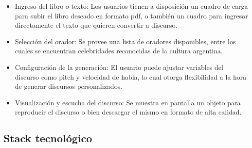 \begin{itemize}
    \item Ingreso del libro o texto: Los usuarios tienen a disposición un cuadro de carga para subir el libro deseado en formato pdf, o también un cuadro para ingresar directamente el texto que quieren convertir a discurso.
    \item Selección del orador: Se provee una lista de oradores disponibles, entre los cuales se encuentran celebridades reconocidas de la cultura argentina.
    \item Configuración de la generación: El usuario puede ajustar variables del discurso como pitch y velocidad de habla, lo cual otorga flexibilidad a la hora de generar discursos personalizados.
    \item Visualización y escucha del discurso: Se muestra en pantalla un objeto para reproducir el discurso o bien descargar el mismo en formato de alta calidad.

\end{itemize}



\subsection{Stack tecnológico}